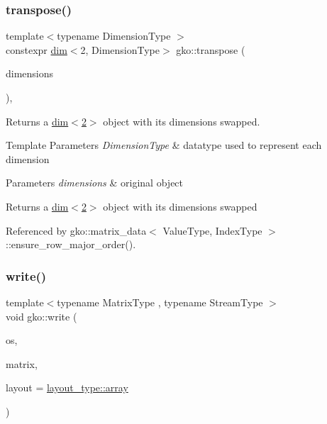 \mbox{\label{namespacegko_a9b6a9d7018703d6d1f2140054e2afe4a}} 
\subsubsection{\texorpdfstring{transpose()}{transpose()}}
{\footnotesize\ttfamily template$<$typename Dimension\+Type $>$ \\
constexpr \hyperlink{structgko_1_1dim}{dim}$<$2, Dimension\+Type$>$ gko\+::transpose (\begin{DoxyParamCaption}\item[{const \hyperlink{structgko_1_1dim}{dim}$<$ 2, Dimension\+Type $>$ \&}]{dimensions }\end{DoxyParamCaption})\hspace{0.3cm}{\ttfamily [inline]}, {\ttfamily [noexcept]}}



Returns a \hyperlink{structgko_1_1dim}{dim$<$2$>$} object with its dimensions swapped. 


\begin{DoxyTemplParams}{Template Parameters}
{\em Dimension\+Type} & datatype used to represent each dimension\\
\hline
\end{DoxyTemplParams}

\begin{DoxyParams}{Parameters}
{\em dimensions} & original object\\
\hline
\end{DoxyParams}
\begin{DoxyReturn}{Returns}
a \hyperlink{structgko_1_1dim}{dim$<$2$>$} object with its dimensions swapped 
\end{DoxyReturn}


Referenced by gko\+::matrix\+\_\+data$<$ Value\+Type, Index\+Type $>$\+::ensure\+\_\+row\+\_\+major\+\_\+order().

\mbox{\label{namespacegko_a859dc47a462721d83728d91ab7fa2148}} 
\subsubsection{\texorpdfstring{write()}{write()}}
{\footnotesize\ttfamily template$<$typename Matrix\+Type , typename Stream\+Type $>$ \\
void gko\+::write (\begin{DoxyParamCaption}\item[{Stream\+Type \&\&}]{os,  }\item[{Matrix\+Type $\ast$}]{matrix,  }\item[{\hyperlink{namespacegko_ae749a5ea11a93c1bcc9158d9a6e9fb68}{layout\+\_\+type}}]{layout = {\ttfamily \hyperlink{namespacegko_ae749a5ea11a93c1bcc9158d9a6e9fb68af1f713c9e000f5d3f280adbd124df4f5}{layout\+\_\+type\+::array}} }\end{DoxyParamCaption})\hspace{0.3cm}{\ttfamily [inline]}}



